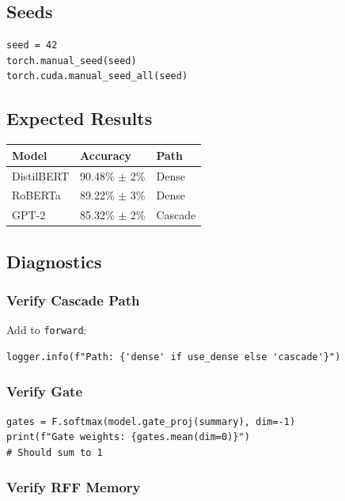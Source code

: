 \subsection{Seeds}

\begin{lstlisting}
seed = 42
torch.manual_seed(seed)
torch.cuda.manual_seed_all(seed)
\end{lstlisting}

\subsection{Expected Results}

\begin{table}[H]
\centering
\small
\begin{tabular}{lll}
\toprule
\textbf{Model} & \textbf{Accuracy} & \textbf{Path} \\
\midrule
DistilBERT & 90.48\% $\pm$ 2\% & Dense \\
RoBERTa & 89.22\% $\pm$ 3\% & Dense \\
GPT-2 & 85.32\% $\pm$ 2\% & Cascade \\
\bottomrule
\end{tabular}
\end{table}

\subsection{Diagnostics}

\subsubsection{Verify Cascade Path}

Add to \texttt{forward}:

\begin{lstlisting}
logger.info(f"Path: {'dense' if use_dense else 'cascade'}")
\end{lstlisting}

\subsubsection{Verify Gate}

\begin{lstlisting}
gates = F.softmax(model.gate_proj(summary), dim=-1)
print(f"Gate weights: {gates.mean(dim=0)}")
# Should sum to 1
\end{lstlisting}

\subsubsection{Verify RFF Memory}


